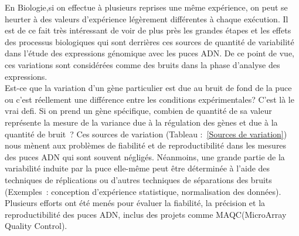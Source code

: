 \documentclass[a4paper,10pt]{article}
\begin{document}
En Biologie,si on effectue à plusieurs reprises une même expérience, on peut se heurter à des valeurs d’expérience légèrement différentes à chaque exécution.
Il est de ce fait très intéressant de voir de plus près les grandes étapes et les effets des processus biologiques qui sont derrières ces sources de quantité de variabilité dans l’étude des expressions génomique avec les puces ADN.
De ce point de vue, ces variations sont considérées comme des bruits dans la phase d’analyse des expressions.\\
Est-ce que la variation d’un gène particulier est due au bruit de fond de la puce ou c’est réellement une différence entre les conditions expérimentales? C’est là le vrai defi. 
Si on prend un gène spécifique, combien de quantité de sa valeur représente la mesure de la variance due à la régulation des gènes et due à la quantité de bruit ?
Ces sources de variation (Tableau :~\ref{Sources de variation}) nous mènent aux problèmes de fiabilité et de reproductibilité dans les mesures des puces ADN qui sont souvent négligés.
Néanmoins, une grande partie de la variabilité induite par la puce elle-même  peut être déterminée à l'aide des techniques 
de réplications ou d’autres techniques de séparations des bruits (Exemples : conception d’expérience statistique, normalisation des données).
Plusieurs efforts ont été menés pour évaluer la fiabilité, la précision et la reproductibilité des puces ADN, inclus des projets comme MAQC(MicroArray Quality Control). \\
\end{document}
